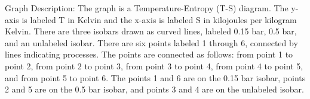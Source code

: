 Graph Description: The graph is a Temperature-Entropy (T-S) diagram. The y-axis is labeled T in Kelvin and the x-axis is labeled S in kilojoules per kilogram Kelvin. There are three isobars drawn as curved lines, labeled 0.15 bar, 0.5 bar, and an unlabeled isobar. There are six points labeled 1 through 6, connected by lines indicating processes. The points are connected as follows: from point 1 to point 2, from point 2 to point 3, from point 3 to point 4, from point 4 to point 5, and from point 5 to point 6. The points 1 and 6 are on the 0.15 bar isobar, points 2 and 5 are on the 0.5 bar isobar, and points 3 and 4 are on the unlabeled isobar.